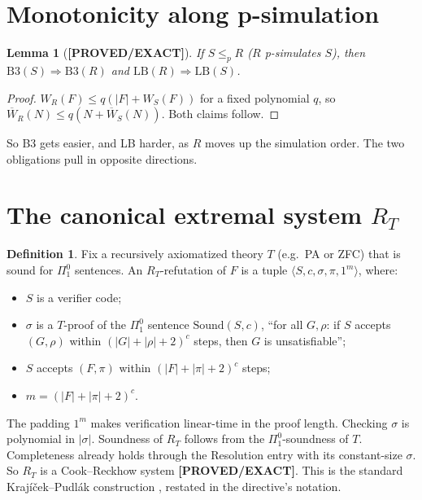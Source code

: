\documentclass[11pt]{article}
\newtheorem{lemma}[theorem]{Lemma}
\theoremstyle{definition}
\newtheorem{definition}[theorem]{Definition}
\theoremstyle{remark}
\newcommand{\Wb}{\overline W}
\newcommand{\Sound}{\mathrm{Sound}}
\newcommand{\status}[1]{\textbf{[#1]}}
\begin{document}
\section{Monotonicity along p-simulation}

\begin{lemma}[\status{PROVED/EXACT}]\label{lem:mono}
If $S\le_p R$ ($R$ p-simulates $S$), then $\mathrm{B3}(S)\Rightarrow\mathrm{B3}(R)$ and
$\mathrm{LB}(R)\Rightarrow\mathrm{LB}(S)$.
\end{lemma}
\begin{proof}
$W_R(F)\le q(|F|+W_S(F))$ for a fixed polynomial $q$, so $\Wb_R(N)\le q(N+\Wb_S(N))$. Both
claims follow.
\end{proof}

So B3 gets easier, and LB harder, as $R$ moves up the simulation order. The two obligations pull in
opposite directions.

\section{The canonical extremal system $R_T$}

\begin{definition}
Fix a recursively axiomatized theory $T$ (e.g.\ PA or ZFC) that is sound for $\Pi^0_1$ sentences.
An $R_T$-refutation of $F$ is a tuple $\langle S,c,\sigma,\pi,1^{m}\rangle$, where:
\begin{itemize}
\item $S$ is a verifier code;
\item $\sigma$ is a $T$-proof of the $\Pi^0_1$ sentence $\Sound(S,c)$, ``for all $G,\rho$: if $S$
accepts $(G,\rho)$ within $(|G|+|\rho|+2)^c$ steps, then $G$ is unsatisfiable'';
\item $S$ accepts $(F,\pi)$ within $(|F|+|\pi|+2)^c$ steps;
\item $m=(|F|+|\pi|+2)^c$.
\end{itemize}
\end{definition}

The padding $1^m$ makes verification linear-time in the proof length. Checking $\sigma$ is
polynomial in $|\sigma|$. Soundness of $R_T$ follows from the $\Pi^0_1$-soundness of $T$.
Completeness already holds through the Resolution entry with its constant-size $\sigma$. So $R_T$ is a
Cook--Reckhow system \status{PROVED/EXACT}. This is the standard Krajíček--Pudlák construction
\cite{KP89}, restated in the directive's notation.
\end{document}
